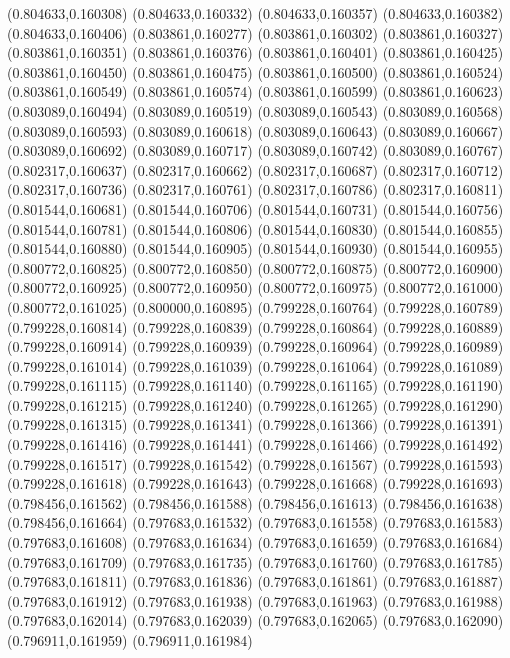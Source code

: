 (0.804633,0.160308)
(0.804633,0.160332)
(0.804633,0.160357)
(0.804633,0.160382)
(0.804633,0.160406)
(0.803861,0.160277)
(0.803861,0.160302)
(0.803861,0.160327)
(0.803861,0.160351)
(0.803861,0.160376)
(0.803861,0.160401)
(0.803861,0.160425)
(0.803861,0.160450)
(0.803861,0.160475)
(0.803861,0.160500)
(0.803861,0.160524)
(0.803861,0.160549)
(0.803861,0.160574)
(0.803861,0.160599)
(0.803861,0.160623)
(0.803089,0.160494)
(0.803089,0.160519)
(0.803089,0.160543)
(0.803089,0.160568)
(0.803089,0.160593)
(0.803089,0.160618)
(0.803089,0.160643)
(0.803089,0.160667)
(0.803089,0.160692)
(0.803089,0.160717)
(0.803089,0.160742)
(0.803089,0.160767)
(0.802317,0.160637)
(0.802317,0.160662)
(0.802317,0.160687)
(0.802317,0.160712)
(0.802317,0.160736)
(0.802317,0.160761)
(0.802317,0.160786)
(0.802317,0.160811)
(0.801544,0.160681)
(0.801544,0.160706)
(0.801544,0.160731)
(0.801544,0.160756)
(0.801544,0.160781)
(0.801544,0.160806)
(0.801544,0.160830)
(0.801544,0.160855)
(0.801544,0.160880)
(0.801544,0.160905)
(0.801544,0.160930)
(0.801544,0.160955)
(0.800772,0.160825)
(0.800772,0.160850)
(0.800772,0.160875)
(0.800772,0.160900)
(0.800772,0.160925)
(0.800772,0.160950)
(0.800772,0.160975)
(0.800772,0.161000)
(0.800772,0.161025)
(0.800000,0.160895)
(0.799228,0.160764)
(0.799228,0.160789)
(0.799228,0.160814)
(0.799228,0.160839)
(0.799228,0.160864)
(0.799228,0.160889)
(0.799228,0.160914)
(0.799228,0.160939)
(0.799228,0.160964)
(0.799228,0.160989)
(0.799228,0.161014)
(0.799228,0.161039)
(0.799228,0.161064)
(0.799228,0.161089)
(0.799228,0.161115)
(0.799228,0.161140)
(0.799228,0.161165)
(0.799228,0.161190)
(0.799228,0.161215)
(0.799228,0.161240)
(0.799228,0.161265)
(0.799228,0.161290)
(0.799228,0.161315)
(0.799228,0.161341)
(0.799228,0.161366)
(0.799228,0.161391)
(0.799228,0.161416)
(0.799228,0.161441)
(0.799228,0.161466)
(0.799228,0.161492)
(0.799228,0.161517)
(0.799228,0.161542)
(0.799228,0.161567)
(0.799228,0.161593)
(0.799228,0.161618)
(0.799228,0.161643)
(0.799228,0.161668)
(0.799228,0.161693)
(0.798456,0.161562)
(0.798456,0.161588)
(0.798456,0.161613)
(0.798456,0.161638)
(0.798456,0.161664)
(0.797683,0.161532)
(0.797683,0.161558)
(0.797683,0.161583)
(0.797683,0.161608)
(0.797683,0.161634)
(0.797683,0.161659)
(0.797683,0.161684)
(0.797683,0.161709)
(0.797683,0.161735)
(0.797683,0.161760)
(0.797683,0.161785)
(0.797683,0.161811)
(0.797683,0.161836)
(0.797683,0.161861)
(0.797683,0.161887)
(0.797683,0.161912)
(0.797683,0.161938)
(0.797683,0.161963)
(0.797683,0.161988)
(0.797683,0.162014)
(0.797683,0.162039)
(0.797683,0.162065)
(0.797683,0.162090)
(0.796911,0.161959)
(0.796911,0.161984)
